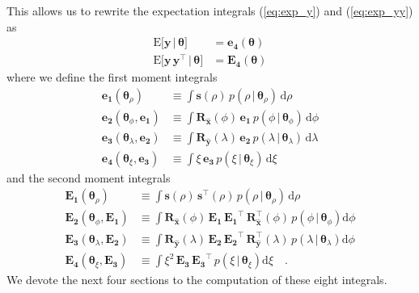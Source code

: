 \documentclass[modern]{aastex62}
\begin{document}
%
This allows us to rewrite the expectation integrals (\ref{eq:exp_y})
and (\ref{eq:exp_yy}) as
%
\begin{align}
    \label{eq:exp_y_sep}
    \mathrm{E} \Big[ \mathbf{y} \, \Big| \, \pmb{\theta} \Big]
     & =
    \mathbf{e_4}(\pmb{\theta})
    \\[1em]
    \label{eq:exp_yy_sep}
    \mathrm{E} \Big[ \mathbf{y} \, \mathbf{y}^\top \, \Big| \, \pmb{\theta} \Big]
     & =
    \mathbf{E_4}(\pmb{\theta})
\end{align}
%
where we define the first moment integrals
%
\begin{align}
    \label{eq:e1}
    \mathbf{e_1}(\pmb{\theta}_\rho)
     & \equiv
    \int
    \mathbf{s}(\rho) \,
    p(\rho \, \big| \, \pmb{\theta}_{\rho}) \,
    \mathrm{d}\rho
    \\[1em]
    \label{eq:e2}
    \mathbf{e_2}(\pmb{\theta}_\phi, \mathbf{e_1})
     & \equiv
    \int
    \mathbf{R}_{\hat{\mathbf{x}}}(\phi) \,
    \mathbf{e_1} \,
    p(\phi \, \big| \, \pmb{\theta}_{\phi}) \,
    \mathrm{d}\phi
    \\[1em]
    \label{eq:e3}
    \mathbf{e_3}(\pmb{\theta}_\lambda, \mathbf{e_2})
     & \equiv
    \int
    \mathbf{R}_{\hat{\mathbf{y}}}(\lambda) \,
    \mathbf{e_2} \,
    p(\lambda \, \big| \, \pmb{\theta}_{\lambda}) \,
    \mathrm{d}\lambda
    \\[1em]
    \label{eq:e4}
    \mathbf{e_4}(\pmb{\theta}_\xi, \mathbf{e_3})
     & \equiv
    \int
    \xi \,
    \mathbf{e_3} \,
    p(\xi \, \big| \, \pmb{\theta}_{\xi}) \,
    \mathrm{d}\xi
\end{align}
%
and the second moment integrals
%
\begin{align}
    \label{eq:E1}
    \mathbf{E_1}(\pmb{\theta}_\rho)
     & \equiv
    \int
    \mathbf{s}(\rho) \, \mathbf{s}^\top(\rho) \,
    p(\rho \, \big| \, \pmb{\theta}_{\rho}) \,
    \mathrm{d}\rho
    \\[1em]
    \label{eq:E2}
    \mathbf{E_2}(\pmb{\theta}_\phi, \mathbf{E_1})
     & \equiv
    \int
    \mathbf{R}_{\hat{\mathbf{x}}}(\phi) \,
    \mathbf{E_1} \,
    \mathbf{E_1}^\top \,
    \mathbf{R}_{\hat{\mathbf{x}}}^\top(\phi) \,
    p(\phi \, \big| \, \pmb{\theta}_{\phi})
    \mathrm{d}\phi
    \\[1em]
    \label{eq:E3}
    \mathbf{E_3}(\pmb{\theta}_\lambda, \mathbf{E_2})
     & \equiv
    \int
    \mathbf{R}_{\hat{\mathbf{y}}}(\lambda) \,
    \mathbf{E_2} \,
    \mathbf{E_2}^\top \,
    \mathbf{R}_{\hat{\mathbf{y}}}^\top(\lambda) \,
    p(\lambda \, \big| \, \pmb{\theta}_{\lambda})
    \mathrm{d}\phi
    \\[1em]
    \label{eq:E4}
    \mathbf{E_4}(\pmb{\theta}_\xi, \mathbf{E_3})
     & \equiv
    \int
    \xi^2 \,
    \mathbf{E_3} \,
    \mathbf{E_3}^\top \,
    p(\xi \, \big| \, \pmb{\theta}_\xi)
    \mathrm{d}\xi
    \quad.
\end{align}
%
We devote the next four sections to the computation of these eight
integrals.
\end{document}
